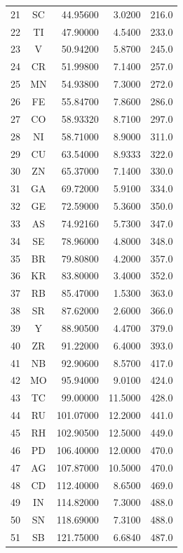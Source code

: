 \begin{longtable}{|rcrrr|}
21 & SC     & 44.95600 &  3.0200    &216.0 \\
22 & TI     & 47.90000 &  4.5400    &233.0 \\
23 & V      & 50.94200 &  5.8700    &245.0 \\
24 & CR     & 51.99800 &  7.1400    &257.0 \\
25 & MN     & 54.93800 &  7.3000    &272.0 \\
26 & FE     & 55.84700 &  7.8600    &286.0 \\
27 & CO     & 58.93320 &  8.7100    &297.0 \\
28 & NI     & 58.71000 &  8.9000    &311.0 \\
29 & CU     & 63.54000 &  8.9333    &322.0 \\
30 & ZN     & 65.37000 &  7.1400    &330.0 \\
31 & GA     & 69.72000 &  5.9100    &334.0 \\
32 & GE     & 72.59000 &  5.3600    &350.0 \\
33 & AS     & 74.92160 &  5.7300    &347.0 \\
34 & SE     & 78.96000 &  4.8000    &348.0 \\
35 & BR     & 79.80800 &  4.2000    &357.0 \\
36 & KR     & 83.80000 &  3.4000    &352.0 \\
37 & RB     & 85.47000 &  1.5300    &363.0 \\
38 & SR     & 87.62000 &  2.6000    &366.0 \\
39 & Y      & 88.90500 &  4.4700    &379.0 \\
40 & ZR     & 91.22000 &  6.4000    &393.0 \\
41 & NB     & 92.90600 &  8.5700    &417.0 \\
42 & MO     & 95.94000 &  9.0100    &424.0 \\
43 & TC     & 99.00000 & 11.5000    &428.0 \\
44 & RU     &101.07000 & 12.2000    &441.0 \\
45 & RH     &102.90500 & 12.5000    &449.0 \\
46 & PD     &106.40000 & 12.0000    &470.0 \\
47 & AG     &107.87000 & 10.5000    &470.0 \\
48 & CD     &112.40000 &  8.6500    &469.0 \\
49 & IN     &114.82000 &  7.3000    &488.0 \\
50 & SN     &118.69000 &  7.3100    &488.0 \\
51 & SB     &121.75000 &  6.6840    &487.0 \\

\end{longtable}
